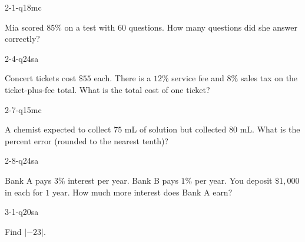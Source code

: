 \begin{practiceQuestion}{2-1-q18}{mc}
\begin{questionText}
Mia scored $85\%$ on a test with $60$ questions. How many questions did she answer correctly?
\end{questionText}
\end{practiceQuestion}

\begin{practiceQuestion}{2-4-q24}{sa}
\begin{questionText}
Concert tickets cost $\$55$ each. There is a $12\%$ service fee and $8\%$ sales tax on the ticket-plus-fee total. What is the total cost of one ticket?
\end{questionText}
\end{practiceQuestion}

\begin{practiceQuestion}{2-7-q15}{mc}
\begin{questionText}
A chemist expected to collect $75$ mL of solution but collected $80$ mL. What is the percent error (rounded to the nearest tenth)?
\end{questionText}
\end{practiceQuestion}

\begin{practiceQuestion}{2-8-q24}{sa}
\begin{questionText}
Bank A pays $3\%$ interest per year. Bank B pays $1\%$ per year. You deposit $\$1{,}000$ in each for $1$ year. How much more interest does Bank A earn?
\end{questionText}
\end{practiceQuestion}

\begin{practiceQuestion}{3-1-q20}{sa}
\begin{questionText}
Find $|{-23}|$.
\end{questionText}
\end{practiceQuestion}

